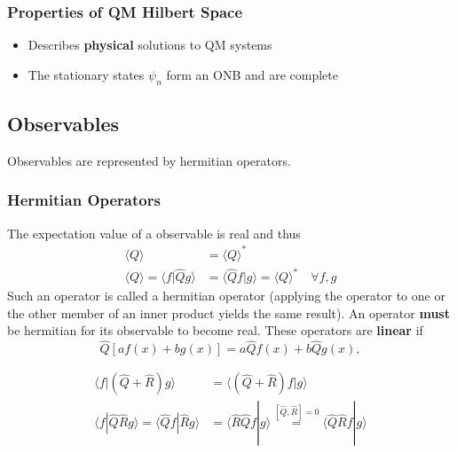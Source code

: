 \subsubsection{Properties of QM Hilbert Space}
\begin{itemize}
    \item Describes \textbf{physical} solutions to QM systems
    \item The stationary states $\psi_n$ form an ONB and are complete
\end{itemize}

\subsection{Observables}
Observables are represented by hermitian operators.
\subsubsection{Hermitian Operators}
The expectation value of a observable is real and thus
\noindent\begin{align*}
    \langle Q\rangle                            & = {\langle Q\rangle}^*                                            \\
    \langle Q\rangle=\langle f|\hat{Q} g\rangle & = \langle \hat{Q}f|g\rangle={\langle Q\rangle}^*\quad \forall f,g
\end{align*}
Such an operator is called a hermitian operator (applying the operator to one or the other member of an inner product yields the same result). An operator \textbf{must} be hermitian for its observable to become real. These operators are \textbf{linear} if
\noindent\begin{equation*}
    \hat{Q}\left[af(x)+bg(x)\right]=a\hat{Q}f(x)+b\hat{Q}g(x),
\end{equation*}


\noindent\begin{align*}
    \langle f|(\hat{Q} + \hat{R})g\rangle                                    & = \langle (\hat{Q} + \hat{R})f|g\rangle                                                               \\[0.75em]
    \langle f|\hat{Q}\hat{R}g\rangle       =\langle \hat{Q}f|\hat{R}g\rangle & =  \langle \hat{R}\hat{Q}f|g\rangle \overset{[\hat{Q},\hat{R}]=0}{=} \langle \hat{Q}\hat{R}f|g\rangle
\end{align*}


